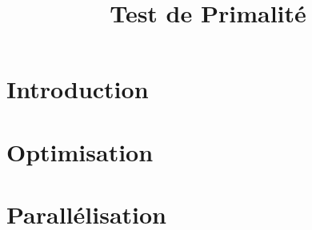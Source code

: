 
\usepackage{../tex/myInfolines}
\usepackage{graphicx}
\usepackage{algorithm}
\usepackage{algorithmic}
\usepackage{subcaption}
\usepackage{longtable,array}
\newenvironment{figure*}%
{\begin{figure}}
{\end{figure}}
\title{Test de Primalité}


	\begin{frame}
		\titlepage
	\end{frame}
	
	\section*{Introduction}
        \begin{frame}
                    
        \end{frame}
	
	\begin{frame}
		\tableofcontents
	\end{frame}
	
	\section{Optimisation}
	\begin{frame}
	
	\end{frame}
	
	\section{Parallélisation}
	\begin{frame}
	
	\end{frame}
	
